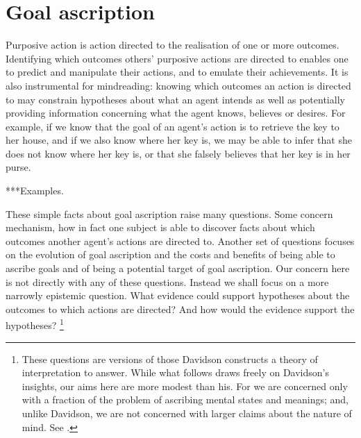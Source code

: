 \documentclass[12pt,a4paper]{extarticle}
\begin{document}
\setlength\footnotesep{1em}


\maketitle

\begin{abstract}
***
\end{abstract}


\section{Goal ascription}
Purposive action is action directed to the realisation of one or more outcomes.
Identifying which outcomes others' purposive actions are directed to enables one
to predict and manipulate their actions, and 
to emulate their achievements.
It is also instrumental for mindreading:
knowing which outcomes an action is directed to may constrain hypotheses about what an agent intends 
as well as
potentially providing information concerning what the agent knows, believes or desires.
For example,
if we know that the goal of an agent's action is to retrieve the key to her house,
and if we also know where her key is,
we may be able to infer that she does not know where her key is,
or that she falsely believes that her key is in her purse.

***Examples.

These simple facts about goal ascription raise many questions.
Some concern mechanism, how in fact one subject is able to discover facts about which outcomes another agent's actions are directed to.
Another set of questions focuses on the evolution of goal ascription and the costs and benefits of being able to ascribe goals and of being a potential target of goal ascription.
Our concern here is not directly with any of these questions.
Instead we shall focus on a more narrowly epistemic question.
What evidence could support hypotheses about the outcomes to which actions are directed?
And how would the evidence support the hypotheses?%
\footnote{
These questions are versions of those Davidson constructs a theory of interpretation to answer.
While what follows draws freely on Davidson's insights,
our aims here are more modest than his.
For we are concerned only with a  fraction of the problem of ascribing mental states and meanings;
and, unlike Davidson, we are not concerned with larger claims about the nature of mind.
See
\citet{Davidson:1973jx,Davidson:1990du,lepore_donald_2005}.
}
\end{document}
